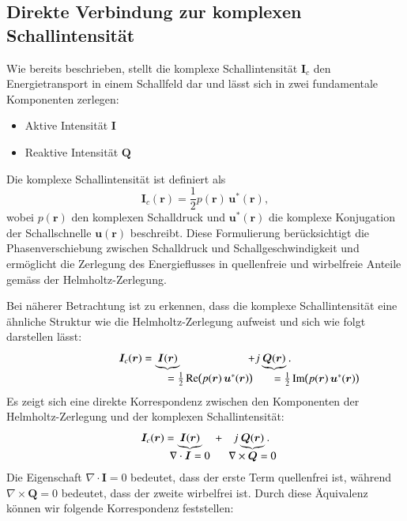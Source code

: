 \subsection{Direkte Verbindung zur komplexen Schallintensität
\label{helmholtz:subsection:Zerlegung_Schallschnelle}}
Wie bereits beschrieben, stellt die komplexe Schallintensität
$\boldsymbol{I}_c$ den Energietransport in einem Schallfeld dar und
lässt sich in zwei fundamentale Komponenten zerlegen:
\begin{itemize}
\item Aktive Intensität $\boldsymbol{I}$
\item Reaktive Intensität $\boldsymbol{Q}$
\end{itemize}
Die komplexe Schallintensität ist definiert als
\begin{equation*}
\boldsymbol{I}_c (\boldsymbol{r})
=
\frac{1}{2} p(\boldsymbol{r}) \, \boldsymbol{u}^{*}(\boldsymbol{r}),
\end{equation*}
wobei $p(\boldsymbol{r})$ den komplexen Schalldruck und
%
$\boldsymbol{u}^{*}(\boldsymbol{r})$ die komplexe Konjugation der
Schallschnelle $\boldsymbol{u}(\boldsymbol{r})$ beschreibt.
Diese
Formulierung berücksichtigt die Phasenverschiebung zwischen Schalldruck
und Schallgeschwindigkeit und ermöglicht die Zerlegung des
Energie\-flusses in quellenfreie und wirbelfreie Anteile gemäss der
Helmholtz-Zerlegung.
 
Bei näherer Betrachtung ist zu erkennen, dass die komplexe
Schallintensität eine ähnliche Struktur wie die Helmholtz-Zerlegung
aufweist und sich wie folgt darstellen lässt:
\begin{equation*}
\boldsymbol{I}_c (\boldsymbol{r})
=
\underbrace{
\boldsymbol{I}(\boldsymbol{r})
}_{\mathstrut
\rlap{$
=\textstyle\frac{1}{2}
\operatorname{Re} \bigl( p(\boldsymbol{r})\, \boldsymbol{u}^*(\boldsymbol{r}) \bigr)
$}
}
\qquad\qquad
\qquad
+
j\underbrace{
\boldsymbol{Q}(\boldsymbol{r})
}_{\mathstrut
\rlap{$\textstyle
=\frac{1}{2}
\operatorname{Im} \bigl( p(\boldsymbol{r})\, \boldsymbol{u}^*(\boldsymbol{r}) \bigr)
$}}.
\end{equation*}
Es zeigt sich eine direkte Korrespondenz zwischen den Komponenten der Helmholtz-Zerlegung und der komplexen Schallintensität:
\begin{equation*}
\boldsymbol{I}_c (\boldsymbol{r})
=
\underbrace{
\boldsymbol{I}(\boldsymbol{r})
}_{
\clap{$\displaystyle\nabla \cdot \boldsymbol{I} = 0$}
}
\quad
+
\quad
j
\underbrace{
\boldsymbol{Q}(\boldsymbol{r})
}_{
\clap{$\displaystyle\nabla \times \boldsymbol{Q} = 0$}
}.
\end{equation*}
Die Eigenschaft $\nabla\cdot\boldsymbol{I}=0$ bedeutet,
dass der erste Term quellenfrei ist, während $\nabla\times\boldsymbol{Q}=0$
bedeutet, dass der zweite wirbelfrei ist.
Durch diese Äquivalenz können wir folgende Korrespondenz feststellen:
 
